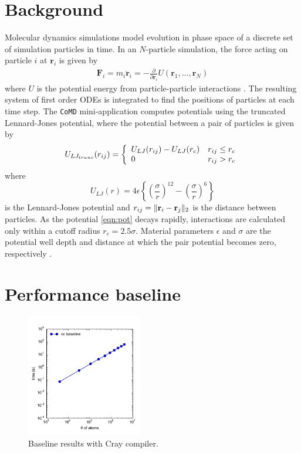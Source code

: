 \documentclass[12pt]{article}
\renewcommand{\v}[1]{\bold{#1}}
\begin{document}
\section{Background}
Molecular dynamics simulations model evolution in phase space of a
discrete set of simulation particles in time. In an $N$-particle
simulation, the force acting on particle $i$ at $\bm{r}_i$ is given by
\begin{align*}
    \textbf{F}_i = m_i \ddot{\bm{r}}_i = -\frac{\partial}{\partial \bm{r}_i} U(\bm{r}_1, \dots, \bm{r}_N)
\end{align*}
where $U$ is the potential energy from particle-particle interactions
\cite{Intro}.  The resulting system of first order ODEs is integrated
to find the positions of particles at each time step. The
\texttt{CoMD} mini-application computes potentials using the truncated
Lennard-Jones potential, where the potential between a pair of
particles is given by
\begin{equation}
U_{LJ_{trunc}}(r_{ij}) = 
\left\{ \begin{array}{l c} 
     U_{LJ}(r_{ij}) - U_{LJ}(r_c) & r_{ij} \le r_c \\
     0 & r_{ij} > r_c
        \end{array} \right.
      \label{eqn:pot}
\end{equation}
where
\begin{equation}
    U_{LJ}(r) = 
    4 \epsilon \left\{ \left(\frac{\sigma}{r}\right)^{12} - 
    \left(\frac{\sigma}{r}\right)^6 \right\}
\end{equation}
is the Lennard-Jones potential and $r_{ij} = \|\v{r}_i-\v{r}_j\|_2$ is
the distance between particles. As the potential \ref{eqn:pot} decays
rapidly, interactions are calculated only within a cutoff radius
$r_c = 2.5 \sigma$. Material parameters $\epsilon$ and $\sigma$ are
the potential well depth and distance at which the pair potential
becomes zero, respectively \cite{Wiki}.

\section{Performance baseline}

\begin{figure}[h!]
  \centering
  \includegraphics[width=0.45\textwidth]{../figs/baseline_forceLJ.pdf}
  \caption{Baseline results with Cray compiler.}
  \label{fig:baseline}
\end{figure}
\end{document}
